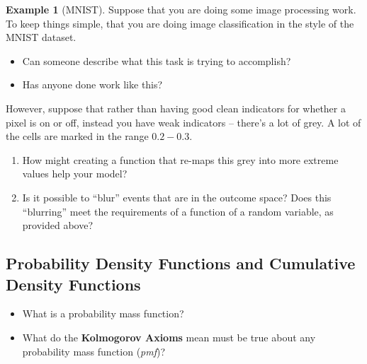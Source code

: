 \documentclass[
]{book}
\providecommand{\tightlist}{%
  \setlength{\itemsep}{0pt}\setlength{\parskip}{0pt}}
\theoremstyle{definition}
\theoremstyle{definition}
\newtheorem{example}{Example}[chapter]
\theoremstyle{definition}
\theoremstyle{definition}
\theoremstyle{remark}
\begin{document}
\begin{example}[MNIST]

Suppose that you are doing some image processing work. To keep things simple, that you are doing image classification in the style of the MNIST dataset.

\begin{itemize}
\tightlist
\item
  Can someone describe what this task is trying to accomplish?
\item
  Has anyone done work like this?
\end{itemize}

However, suppose that rather than having good clean indicators for whether a pixel is on or off, instead you have weak indicators -- there's a lot of grey. A lot of the cells are marked in the range \(0.2 - 0.3\).

\begin{enumerate}
\def\labelenumi{\arabic{enumi}.}
\tightlist
\item
  How might creating a function that re-maps this grey into more extreme values help your model?
\item
  Is it possible to ``blur'' events that are in the outcome space? Does this ``blurring'' meet the requirements of a function of a random variable, as provided above?
\end{enumerate}

\end{example}

\hypertarget{probability-density-functions-and-cumulative-density-functions}{%
\subsection{Probability Density Functions and Cumulative Density Functions}\label{probability-density-functions-and-cumulative-density-functions}}

\begin{itemize}
\tightlist
\item
  What is a probability mass function?
\item
  What do the \textbf{Kolmogorov Axioms} mean must be true about any probability mass function (\emph{pmf})?
\end{itemize}
\end{document}

